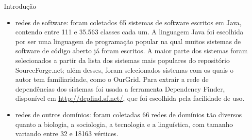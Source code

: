 \begin{section}{Introdução}
\begin{itemize}
	\item redes de software: foram coletados 65 sistemas de software escritos em Java, contendo entre 111 e 35.563 classes cada um. A linguagem Java foi escolhida por ser uma linguagem de programação popular na qual muitos sistemas de software de código aberto já foram escritos. A maior parte dos sistemas foram selecionados a partir da lista dos sistemas mais populares do repositório SourceForge.net; além desses, foram selecionados sistemas com os quais o autor tem familiaridade, como o OurGrid. Para extrair a rede de dependências dos sistemas foi usada a ferramenta Dependency Finder, disponível em \url{http://depfind.sf.net/}, que foi escolhida pela facilidade de uso.
	\item redes de outros domínios: foram coletadas 66 redes de domínios tão diversos quanto a biologia, a sociologia, a tecnologia e a linguística, com tamanho variando entre 32 e 18163 vértices.
\end{itemize}

\end{section}

